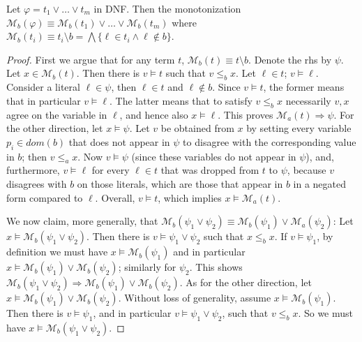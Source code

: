 \documentclass[acmsmall,screen]{acmart}
\newcommand{\toolong}[1]{#1}
\newcommand{\toolong}[1]{}
\newcommand{\dom}[1]{dom({#1})}
\renewcommand{\implies}{\Longrightarrow}
\newcommand{\set}[1]{\{{#1}\}}
\newcommand{\monox}[2]{\mathcal{M}_{#2}({#1})}
\newcommand{\cubdom}[1]{\dom{#1}}
\begin{document}
\begin{lemma}
\label{lem:bshouty-mon-mindnf}
Let $\varphi = t_1 \lor \ldots \lor t_m$ in DNF. Then the monotonization $\monox{\varphi}{b} \equiv \monox{t_1}{b} \lor \ldots \lor \monox{t_m}{b}$ where $\monox{t_i}{b} \equiv t_i \setminus b = \bigwedge \set{\ell \in t_i \land \ell \not\in b}$.
%
%
\end{lemma}
\toolong{
\begin{proof}
First we argue that for any term $t$, $\monox{t}{b} \equiv t \setminus b$. Denote the rhs by $\psi$.
Let $x \in \monox{t}{b}$. Then there is $v \models t$ such that $v \leq_b x$. Let $\ell \in t$; $v \models \ell$. Consider a literal $\ell \in \psi$, then $\ell \in t$ and $\ell \not\in b$. Since $v \models t$, the former means that in particular $v \models \ell$. The latter means that to satisfy $v \leq_b x$ necessarily $v,x$ agree on the variable in $\ell$, and hence also $x \models \ell$. This proves $\monox{t}{a} \implies \psi$.
%
For the other direction, let $x \models \psi$. Let $v$ be obtained from $x$ by setting every variable $p_i \in \cubdom{b}$ that does not appear in $\psi$ to disagree with the corresponding value in $b$; then $v \leq_a x$. Now $v \models \psi$ (since these variables do not appear in $\psi$), and, furthermore, $v \models \ell$ for every $\ell \in t$ that was dropped from $t$ to $\psi$, because $v$ disagrees with $b$ on those literals, which are those that appear in $b$ in a negated form compared to $\ell$. Overall, $v \models t$, which implies $x \models \monox{t}{a}$.
%

We now claim, more generally, that $\monox{\psi_1 \lor \psi_2}{b} \equiv \monox{\psi_1}{b} \lor \monox{\psi_2}{a}$:
Let $x \models \monox{\psi_1 \lor \psi_2}{b}$. Then there is $v \models \psi_1 \lor \psi_2$ such that $x \leq_b x$. If $v \models \psi_1$, by definition we must have $x \models \monox{\psi_1}{b}$ and in particular $x \models \monox{\psi_1}{b} \lor \monox{\psi_2}{b}$; similarly for $\psi_2$. This shows $\monox{\psi_1 \lor \psi_2}{b} \implies \monox{\psi_1}{b} \lor \monox{\psi_2}{b}$.
As for the other direction, let $x \models \monox{\psi_1}{b} \lor \monox{\psi_2}{b}$. Without loss of generality, assume $x \models \monox{\psi_1}{b}$. Then there is $v \models \psi_1$, and in particular $v \models \psi_1 \lor \psi_2$, such that $v \leq_b x$. So we must have $x \models \monox{\psi_1 \lor \psi_2}{b}$.
\end{proof}
}
\end{document}
